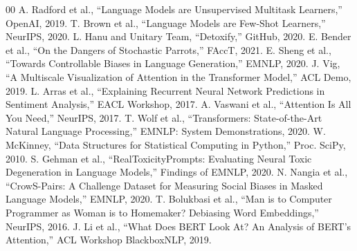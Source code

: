 \documentclass[conference]{IEEEtran}
\begin{document}
\begin{thebibliography}{00}
 A. Radford et al., ``Language Models are Unsupervised Multitask Learners,'' OpenAI, 2019.
 T. Brown et al., ``Language Models are Few-Shot Learners,'' NeurIPS, 2020.
 L. Hanu and Unitary Team, ``Detoxify,'' GitHub, 2020.
 E. Bender et al., ``On the Dangers of Stochastic Parrots,'' FAccT, 2021.
 E. Sheng et al., ``Towards Controllable Biases in Language Generation,'' EMNLP, 2020.
 J. Vig, ``A Multiscale Visualization of Attention in the Transformer Model,'' ACL Demo, 2019.
 L. Arras et al., ``Explaining Recurrent Neural Network Predictions in Sentiment Analysis,'' EACL Workshop, 2017.
 A. Vaswani et al., ``Attention Is All You Need,'' NeurIPS, 2017.
 T. Wolf et al., ``Transformers: State-of-the-Art Natural Language Processing,'' EMNLP: System Demonstrations, 2020.
 W. McKinney, ``Data Structures for Statistical Computing in Python,'' Proc. SciPy, 2010.
 S. Gehman et al., ``RealToxicityPrompts: Evaluating Neural Toxic Degeneration in Language Models,'' Findings of EMNLP, 2020.
 N. Nangia et al., ``CrowS-Pairs: A Challenge Dataset for Measuring Social Biases in Masked Language Models,'' EMNLP, 2020.
 T. Bolukbasi et al., ``Man is to Computer Programmer as Woman is to Homemaker? Debiasing Word Embeddings,'' NeurIPS, 2016.
 J. Li et al., ``What Does BERT Look At? An Analysis of BERT's Attention,'' ACL Workshop BlackboxNLP, 2019.
\end{thebibliography}
\end{document}
